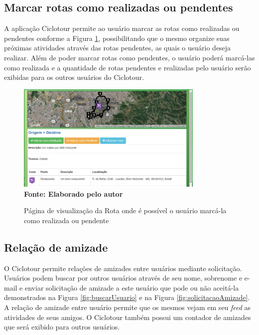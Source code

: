 \subsection{Marcar rotas como realizadas ou pendentes}
A aplicação Ciclotour permite ao usuário marcar as rotas como realizadas ou pendentes conforme a Figura \ref{fig:marcarRota}, possibilitando que o 
mesmo organize suas próximas atividades através das rotas pendentes, as quais o usuário deseja realizar. Além de poder marcar rotas como pendentes, 
o usuário poderá marcá-las como realizada e a quantidade de rotas pendentes e realizadas pelo usuário serão exibidas para os outros usuários do 
Ciclotour.

\begin{figure}[!ht]
	\centering	
	\caption[\hspace{0.1cm} Marcar rotas como realizadas ou pendentes.]
	{Página de visualização da Rota onde é possível o usuário marcá-la como realizada ou pendente}
	  \vspace{-0.4cm}
	\includegraphics[width=0.8\textwidth]{figuras/marcarRota.png}
	 \vspace{0cm}
	\\\textbf{\footnotesize Fonte: Elaborado pelo autor}
	\label{fig:marcarRota}
\end{figure}

\subsection{Relação de amizade}

O Ciclotour permite relações de amizades entre usuários mediante solicitação. Usuários podem buscar por outros usuários através de seu nome, 
sobrenome e e-mail e enviar solicitação de amizade a este usuário que pode ou não aceitá-la demonstrados na Figura \ref{fig:buscarUsuario} e na 
Figura \ref{fig:solicitacaoAmizade}. A relação de amizade entre usuário permite que os mesmos vejam em seu \textit{feed} as atividades de seus amigos. O 
Ciclotour também possui um contador de amizades que será exibido para outros usuários.

